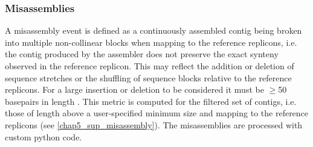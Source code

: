 \subsubsection{Misassemblies}

A misassembly event is defined as a continuously assembled contig being broken into multiple non-collinear blocks when mapping to the reference replicons, i.e. the contig produced by the assembler does not preserve the exact synteny observed in the reference replicon. This may reflect the addition or deletion of sequence stretches or the shuffling of sequence blocks relative to the reference replicons. For a large insertion or deletion to be considered it must be $\geq $50 basepairs in length \cite{kosugi_comprehensive_2019}. This metric is computed for the filtered set of contigs, i.e. those of length above a user-specified minimum size and mapping to the reference replicons (see \ref{chap5_sup_misassembly}). The misassemblies are processed with custom python code. 


